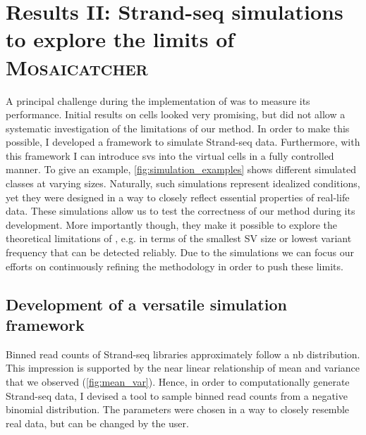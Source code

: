 \FloatBarrier
\section{Results II: Strand-seq simulations to explore the limits of \textsc{Mosaicatcher}}
\label{sec:mosaic_simul}

A principal challenge during the implementation of \mc was to measure its
performance. Initial results on  cells looked very promising, but did not
allow a systematic investigation of the limitations of our method. In order to
make this possible, I developed a framework to simulate Strand-seq data.
Furthermore, with this framework I can introduce \acp{sv}  into the virtual cells in a fully
controlled manner. To give an example, \cref{fig:simulation_examples} shows
different simulated \sv classes at varying sizes. Naturally, such simulations
represent idealized conditions, yet they were designed in a way to closely
reflect essential properties of real-life data.
These simulations allow us to test the correctness of our method during its
development. More importantly though, they make it possible to explore the
theoretical limitations of \mc, e.g. in terms of the smallest SV size or lowest
variant frequency that can be detected reliably. Due to the
simulations we can focus our efforts on continuously refining the methodology in
order to push these limits.





\subsection{Development of a versatile simulation framework}
\label{sec:mosaic_simul_framework}

Binned read counts of Strand-seq libraries approximately follow a \acl{nb}
distribution. This impression is supported by the near linear relationship of
mean and variance that we observed (\cref{fig:mean_var}). Hence, in order to
computationally generate Strand-seq data, I devised a tool to sample binned read
counts from a negative binomial distribution. The \nb parameters were chosen
in a way to closely resemble real data, but can be changed by the user.

